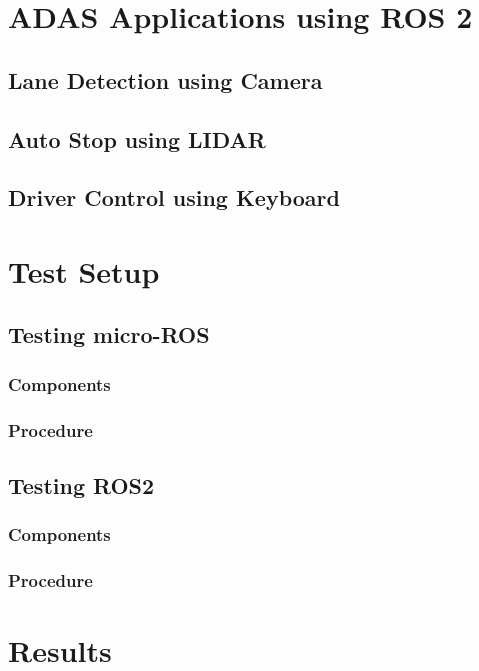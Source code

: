 \documentclass[%
xelatex,
	oneside,		%
	12pt,			%
	parskip=half,	%
	abstracton,
	chapterprefix=true%
    appendixprefix=true]
{scrbook}
\begin{document}
	\chapter{ADAS Applications using ROS 2}
		
\rofoot[\pagemark]{\pagemark}
		\section{Lane Detection using Camera}
		\section{Auto Stop using LIDAR}
		\section{Driver Control using Keyboard}	
	
	
	
	\chapter{Test Setup}
		
\rofoot[\pagemark]{\pagemark}

	\section{Testing micro-ROS}

	\subsection{Components}
	\subsection{Procedure}	

	\section{Testing ROS2}
	\subsection{Components}
	\subsection{Procedure}	


		\chapter{Results}
			
\end{document}

